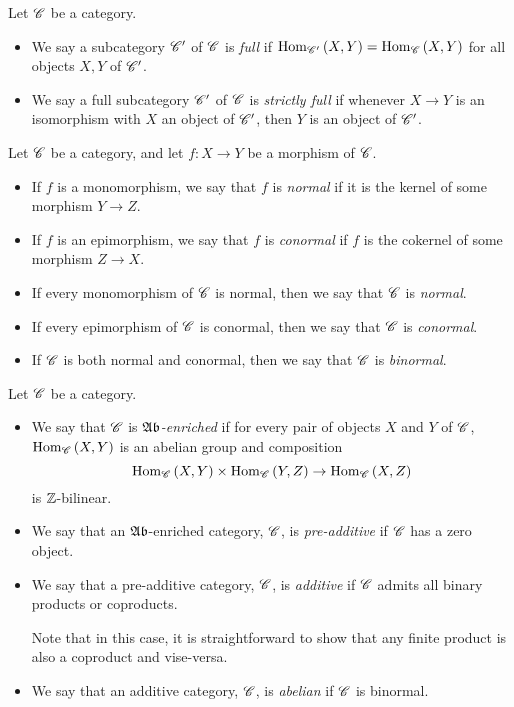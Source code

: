 \documentclass[dissertation.tex]{subfiles}
\begin{document}
\begin{defn}
  Let $\mathscr{C}$ be a category.
  \begin{itemize}
  \item
    We say a subcategory $\mathscr{C}^\prime$ of $\mathscr{C}$ is {\it full} if 
    $\operatorname{Hom}_{\mathscr{C}^\prime}\left(X,Y\right) = \operatorname{Hom}_{\mathscr{C}}\left(X,Y\right)$
    for all objects $X,Y$ of $\mathscr{C}^\prime$.
  \item
    We say a full subcategory $\mathscr{C}^\prime$ of $\mathscr{C}$ is {\it strictly full} if whenever $X \rightarrow Y$ is an isomorphism with $X$ an object of $\mathscr{C}^\prime$, then $Y$ is an object of $\mathscr{C}^\prime$.
  \end{itemize}
\end{defn}

\begin{defn}
  Let $\mathscr{C}$ be a category, and let $f : X \to Y$ be a morphism of $\mathscr{C}$.
  \begin{itemize}
    \item
      If $f$ is a monomorphism, we say that $f$ is {\it normal} if it is the kernel of some morphism $Y \rightarrow Z$.
    \item
      If $f$ is an epimorphism, we say that $f$ is {\it conormal} if $f$ is the cokernel of some morphism $Z \rightarrow X$.
    \item
      If every monomorphism of $\mathscr{C}$ is normal, then we say that $\mathscr{C}$ is {\it normal}.
    \item
      If every epimorphism of $\mathscr{C}$ is conormal, then we say that $\mathscr{C}$ is {\it conormal}.
    \item
      If $\mathscr{C}$ is both normal and conormal, then we say that $\mathscr{C}$ is {\it binormal}.
  \end{itemize}
  
\end{defn}

\begin{defn}
  Let $\mathscr{C}$ be a category.
  \begin{itemize}
  \item
    We say that $\mathscr{C}$ is {\it $\mathfrak{Ab}$-enriched} if for every pair of objects $X$ and $Y$ of $\mathscr{C}$, $\operatorname{Hom}_{\mathscr{C}}\left(X,Y\right)$ is an abelian group and composition 
    $$\operatorname{Hom}_{\mathscr{C}}\left(X,Y\right) \times \operatorname{Hom}_{\mathscr{C}}\left(Y,Z\right) \rightarrow \operatorname{Hom}_{\mathscr{C}}\left(X,Z\right)$$
    is $\mathbb{Z}$-bilinear.
  \item
    We say that an $\mathfrak{Ab}$-enriched category, $\mathscr{C}$, is {\it pre-additive} if $\mathscr{C}$ has a zero object.
  \item
    We say that a pre-additive category, $\mathscr{C}$, is {\it additive} if $\mathscr{C}$ admits all binary products or coproducts.
    \begin{rmk}
      Note that in this case, it is straightforward to show that any finite product is also a coproduct and vise-versa.
    \end{rmk}
  \item
    We say that an additive category, $\mathscr{C}$, is {\it abelian} if $\mathscr{C}$ is binormal.
  \end{itemize}
\end{defn}
\end{document}
